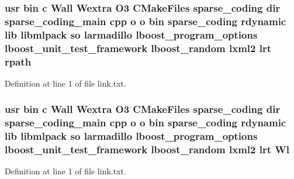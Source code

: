 \subsubsection[{rpath}]{\setlength{\rightskip}{0pt plus 5cm}usr bin c Wall Wextra O3 C\-Make\-Files sparse\-\_\-coding dir sparse\-\_\-coding\-\_\-main cpp o o bin sparse\-\_\-coding rdynamic lib libmlpack so larmadillo lboost\-\_\-program\-\_\-options lboost\-\_\-unit\-\_\-test\-\_\-framework lboost\-\_\-random lxml2 lrt rpath}\label{methods_2sparse__coding_2CMakeFiles_2sparse__coding_8dir_2link_8txt_a0f19e7075ecadac58a8e5a5e861ac13a}


Definition at line 1 of file link.\-txt.

\subsubsection[{Wl}]{\setlength{\rightskip}{0pt plus 5cm}usr bin c Wall Wextra O3 C\-Make\-Files sparse\-\_\-coding dir sparse\-\_\-coding\-\_\-main cpp o o bin sparse\-\_\-coding rdynamic lib libmlpack so larmadillo lboost\-\_\-program\-\_\-options lboost\-\_\-unit\-\_\-test\-\_\-framework lboost\-\_\-random lxml2 lrt Wl}\label{methods_2sparse__coding_2CMakeFiles_2sparse__coding_8dir_2link_8txt_af13cef74f0372fdbe4d06c82d22357e3}


Definition at line 1 of file link.\-txt.

